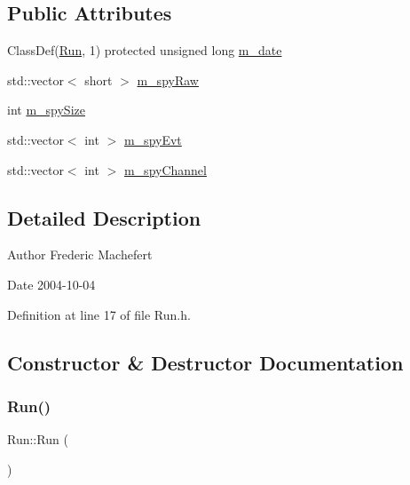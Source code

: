 \subsection*{Public Attributes}
\begin{DoxyCompactItemize}
\item 
Class\+Def(\hyperlink{classRun}{Run}, 1) protected unsigned long \hyperlink{classRun_a841000f96566fdbe5772f16ef3963006}{m\+\_\+date}
\item 
std\+::vector$<$ short $>$ \hyperlink{classRun_a825ab81f2a93f291878235dc13536688}{m\+\_\+spy\+Raw}
\item 
int \hyperlink{classRun_a343bd5a0475c262da9b366933cf3a523}{m\+\_\+spy\+Size}
\item 
std\+::vector$<$ int $>$ \hyperlink{classRun_ae812e1695eafeb95fb54594047e98d95}{m\+\_\+spy\+Evt}
\item 
std\+::vector$<$ int $>$ \hyperlink{classRun_abe97602a3597cc941906069386a8d9aa}{m\+\_\+spy\+Channel}
\end{DoxyCompactItemize}


\subsection{Detailed Description}
\begin{DoxyAuthor}{Author}
Frederic Machefert 
\end{DoxyAuthor}
\begin{DoxyDate}{Date}
2004-\/10-\/04 
\end{DoxyDate}


Definition at line 17 of file Run.\+h.



\subsection{Constructor \& Destructor Documentation}
\mbox{\label{classRun_ad9511732117430d7fcdc0c11796f0ef6}} 
\subsubsection{\texorpdfstring{Run()}{Run()}\hspace{0.1cm}{\footnotesize\ttfamily [1/3]}}
{\footnotesize\ttfamily Run\+::\+Run (\begin{DoxyParamCaption}{ }\end{DoxyParamCaption})}



